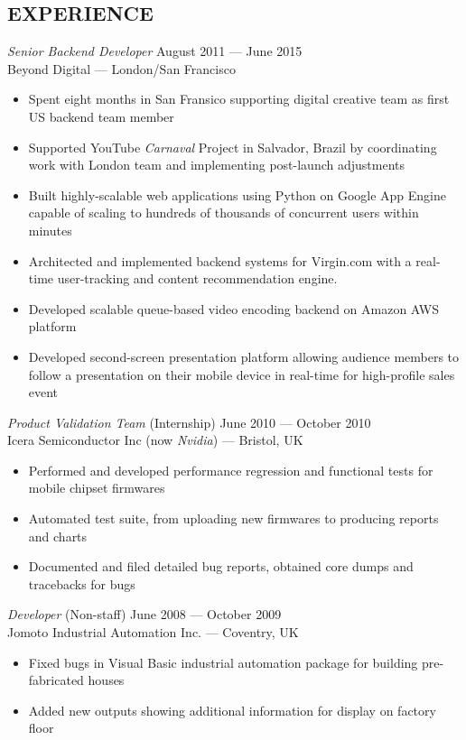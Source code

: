 \documentclass[margin, 10pt]{res} %
\begin{document}
\begin{resume}
\section{EXPERIENCE}

{\sl Senior Backend Developer} \hfill August 2011 --- June 2015 \\
Beyond Digital --- London/San Francisco \\

\begin{itemize} \itemsep -2pt %
\item Spent eight months in San Fransico supporting digital creative team as first US backend team member
\item Supported YouTube \textit{Carnaval} Project in Salvador, Brazil by coordinating work with London team and implementing post-launch adjustments
\item Built highly-scalable web applications using Python on Google App Engine capable of scaling
to hundreds of thousands of concurrent users within minutes
\item Architected and implemented backend systems for Virgin.com with a real-time user-tracking and content recommendation engine.
\item Developed scalable queue-based video encoding backend on Amazon AWS platform
\item Developed second-screen presentation platform allowing audience members to follow a presentation on their mobile device in real-time for high-profile sales event
\end{itemize}

{\sl Product Validation Team} \hfill (Internship) June 2010 --- October 2010 \\
Icera Semiconductor Inc (now \textit{Nvidia}) --- Bristol, UK \\
\begin{itemize} 
\item Performed and developed performance regression and functional tests for mobile chipset firmwares
\item Automated test suite, from uploading new firmwares to producing reports and charts
\item Documented and filed detailed bug reports, obtained core dumps and tracebacks for bugs
\end{itemize} 
\clearpage
{\sl Developer} \hfill (Non-staff) June 2008 --- October 2009 \\
Jomoto Industrial Automation Inc. --- Coventry, UK \\
\begin{itemize}
\item Fixed bugs in Visual Basic industrial automation package for building pre-fabricated houses
\item Added new outputs showing additional information for display on factory floor
\end{itemize} 


\end{resume}
\end{document}
